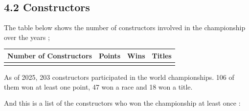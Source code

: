 \documentclass[
]{article}
\begin{document}
\newpage

\subsection{4.2 Constructors}\label{constructors}

The table below shows the number of constructors involved in the
championship over the years ;

\begin{table}[!h]
\centering\begingroup\fontsize{9}{11}\selectfont

\begin{tabular}[t]{>{\raggedleft\arraybackslash}p{2cm}>{\raggedleft\arraybackslash}p{2cm}>{\raggedleft\arraybackslash}p{2cm}>{\raggedleft\arraybackslash}p{2cm}}
\toprule
Number of Constructors & Points & Wins & Titles\\
\midrule
203 & 106 & 47 & 18\\
\bottomrule
\end{tabular}
\endgroup{}
\end{table}

As of 2025, 203 constructors participated in the world championships.
106 of them won at least one point, 47 won a race and 18 won a title.

And this is a list of the constructors who won the championship at least
once :
\end{document}
